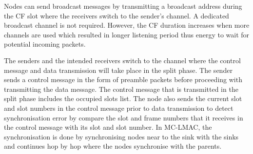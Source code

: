 Nodes can send broadcast messages by transmitting a broadcast address during the CF slot where the receivers switch to the sender's channel. A dedicated broadcast channel is not required. However, the CF duration increases when more channels are used which resulted in longer listening period thus energy to wait for potential incoming packets.

The senders and the intended receivers switch to the channel where the control message and data transmission will take place in the split phase. The sender sends a control message in the form of preamble packets before proceeding with transmitting the data message. The control message that is transmitted in the split phase includes the occupied slots list. The node also sends the current slot and slot numbers in the control message prior to data transmission to detect synchronisation error by compare the slot and frame numbers that it receives in the control message with its slot and slot number. In MC-LMAC, the synchronisation is done by synchronising nodes near to the sink with the sinks and continues hop by hop where the nodes synchronise with the parents. 
 





